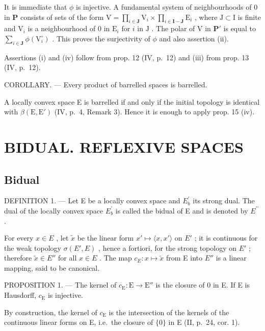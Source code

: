 It is immediate that \(\phi\) is injective. A fundamental system of neighbourhoods of 0 in \(\mathbf{P}\) consists of sets of the form \(\mathrm{V} = \prod_{i\in \mathbf{J}}\mathrm{V}_i\times \prod_{i\in \mathbf{I} - \mathbf{J}}\mathrm{E}_i\) , where \(\mathrm{J}\subset \mathrm{I}\) is finite and \(\mathrm{V}_i\) is a neighbourhood of 0 in \(\mathrm{E}_i\) for \(i\) in \(\mathrm{J}\) . The polar of \(\mathrm{V}\) in \(\mathbf{P}'\) is equal to \(\sum_{i\in \mathbf{J}}\phi (\mathrm{V}_i^\circ)\) . This proves the surjectivity of \(\phi\) and also assertion (ii).

Assertions (i) and (iv) follow from prop. 12 (IV, p.~12) and (iii) from prop. 13 (IV, p.~12).

COROLLARY. --- Every product of barrelled spaces is barrelled.

A locally convex space E is barrelled if and only if the initial topology is identical with \(\beta(\mathrm{E}, \mathrm{E}')\) (IV, p.~4, Remark 3). Hence it is enough to apply prop. 15 (iv).

\section{BIDUAL. REFLEXIVE SPACES}

\subsection{Bidual}

DEFINITION 1. --- Let E be a locally convex space and \(E_{b}^{\prime}\) its strong dual. The dual of the locally convex space \(E_{b}^{\prime}\) is called the bidual of E and is denoted by \(E^{\prime\prime}\) .

For every \(x \in E\) , let \(\tilde{x}\) be the linear form \(x' \mapsto \langle x, x' \rangle\) on \(E'\) ; it is continuous for the weak topology \(\sigma(E', E)\) , hence a fortiori, for the strong topology on \(E'\) ; therefore \(\tilde{x} \in E''\) for all \(x \in E\) . The map \(c_{E}: x \mapsto \tilde{x}\) from E into \(E''\) is a linear mapping, said to be canonical.

PROPOSITION 1. --- The kernel of \(c_{\mathrm{E}}: \mathrm{E} \to \mathrm{E}''\) is the closure of 0 in E. If E is Hausdorff, \(c_{\mathrm{E}}\) is injective.

By construction, the kernel of \(c_{\mathrm{E}}\) is the intersection of the kernels of the continuous linear forms on E, i.e.~the closure of \(\{0\}\) in E (II, p.~24, cor. 1).

